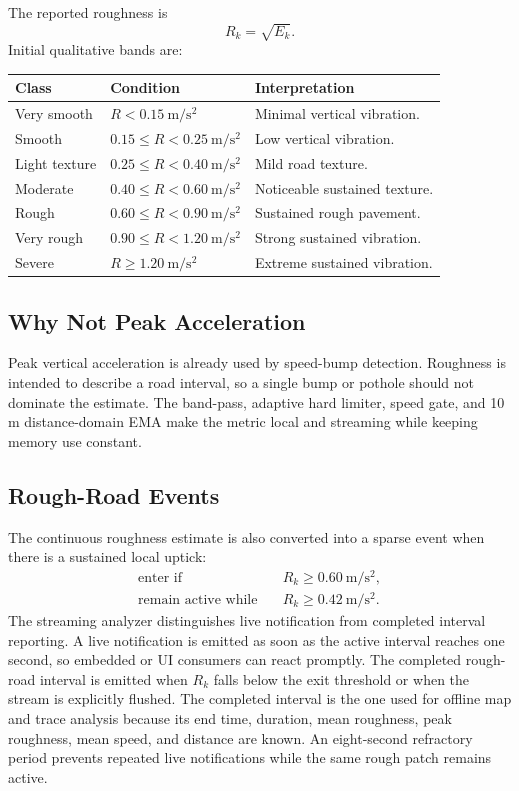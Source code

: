 \documentclass[11pt]{article}
\begin{document}
The reported roughness is
\begin{equation}
  R_k = \sqrt{E_k}.
\end{equation}
Initial qualitative bands are:
\begin{center}
\begin{tabular}{lll}
\toprule
Class & Condition & Interpretation \\
\midrule
Very smooth & \(R<0.15~\mathrm{m/s^2}\) & Minimal vertical vibration. \\
Smooth & \(0.15\le R<0.25~\mathrm{m/s^2}\) & Low vertical vibration. \\
Light texture & \(0.25\le R<0.40~\mathrm{m/s^2}\) & Mild road texture. \\
Moderate & \(0.40\le R<0.60~\mathrm{m/s^2}\) & Noticeable sustained texture. \\
Rough & \(0.60\le R<0.90~\mathrm{m/s^2}\) & Sustained rough pavement. \\
Very rough & \(0.90\le R<1.20~\mathrm{m/s^2}\) & Strong sustained vibration. \\
Severe & \(R\ge1.20~\mathrm{m/s^2}\) & Extreme sustained vibration. \\
\bottomrule
\end{tabular}
\end{center}

\subsection{Why Not Peak Acceleration}

Peak vertical acceleration is already used by speed-bump detection. Roughness is
intended to describe a road interval, so a single bump or pothole should not
dominate the estimate. The band-pass, adaptive hard limiter, speed gate, and
10 m distance-domain EMA make the metric local and streaming while keeping
memory use constant.

\subsection{Rough-Road Events}

The continuous roughness estimate is also converted into a sparse event when
there is a sustained local uptick:
\begin{align}
  \text{enter if}\quad &R_k \ge 0.60~\mathrm{m/s^2},\\
  \text{remain active while}\quad &R_k \ge 0.42~\mathrm{m/s^2}.
\end{align}
The streaming analyzer distinguishes live notification from completed interval
reporting. A live notification is emitted as soon as the active interval reaches
one second, so embedded or UI consumers can react promptly. The completed
rough-road interval is emitted when \(R_k\) falls below the exit threshold or
when the stream is explicitly flushed. The completed interval is the one used
for offline map and trace analysis because its end time, duration, mean
roughness, peak roughness, mean speed, and distance are known. An eight-second
refractory period prevents repeated live notifications while the same rough
patch remains active.
\end{document}
